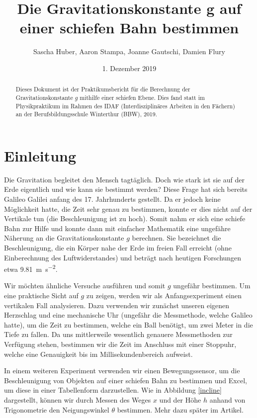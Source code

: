 \documentclass[a4paper, titlepage]{article}
\title{Die Gravitationskonstante g
auf einer schiefen Bahn bestimmen}
\author{Sascha Huber, Aaron Stampa, Joanne Gautschi, Damien Flury}
\date{1. Dezember 2019}
\newcommand{\accunit}[1]{\SI{#1}{\metre\per\square\second}}
\begin{document}
    \maketitle
    \begin{abstract}
       Dieses Dokument ist der Praktikumsbericht für die Berechnung
       der Gravitationskonstante $g$ mithilfe einer schiefen Ebene.
       Dies fand statt im Physikpraktikum im Rahmen des IDAF
       (Interdisziplinäres Arbeiten in den Fächern) an der
       Berufsbildungsschule Winterthur (BBW), 2019.
    \end{abstract}
    \tableofcontents
    \newpage



    \section{Einleitung}
    Die Gravitation begleitet den Mensch tagtäglich. Doch wie stark
    ist sie auf der Erde eigentlich und wie kann sie bestimmt werden?
    Diese Frage hat sich bereits Galileo Galilei anfang des 17. Jahrhunderts
    gestellt. Da er jedoch keine Möglichkeit hatte, die
    Zeit sehr genau zu bestimmen, konnte er dies nicht auf der
    Vertikale tun (die Beschleunigung ist zu hoch). Somit nahm er
    sich eine schiefe Bahn zur Hilfe und konnte dann mit einfacher
    Mathematik eine ungefähre Näherung an die Gravitationskonstante $g$
    berechnen. Sie bezeichnet die Beschleunigung, die ein Körper nahe
    der Erde im freien Fall erreicht (ohne Einberechnung des 
    Luftwiderstandes) und beträgt nach heutigen Forschungen
    etwa \accunit{9.81}.

    Wir möchten ähnliche Versuche ausführen und somit $g$ ungefähr bestimmen. 
    Um eine praktische Sicht auf $g$ zu zeigen, werden wir als Anfangsexperiment einen
    vertikalen Fall analysieren. Dazu verwenden wir zunächst unseren eigenen
    Herzschlag und eine mechanische Uhr (ungefähr die Messmethode, 
    welche Galileo hatte), um die Zeit zu bestimmen, welche ein Ball
    benötigt, um zwei Meter in die Tiefe zu fallen. Da uns mittlerweile
    wesentlich genauere Messmethoden zur Verfügung stehen, bestimmen wir
    die Zeit im Anschluss mit einer Stoppuhr, welche eine Genauigkeit bis im 
    Millisekundenbereich aufweist.
    
    In einem weiteren Experiment verwenden wir einen Bewegungssensor, um
    die Beschleunigung von Objekten auf einer schiefen Bahn zu bestimmen
    und Excel, um diese in einer Tabellenform darzustellen. Wie in 
    Abbildung \ref{incline} dargestellt, können wir durch Messen des
    Weges $x$ und der Höhe $h$ anhand von Trigonometrie den Neigungswinkel
    $\theta$ bestimmen. Mehr dazu später im Artikel.
\end{document}

